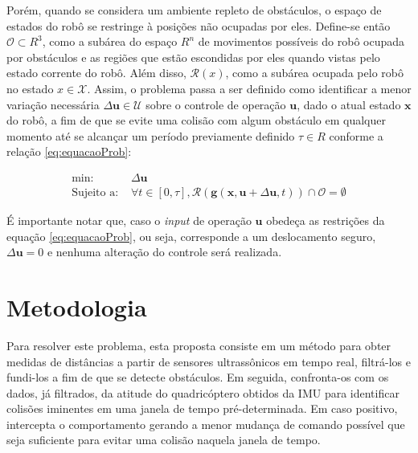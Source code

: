 \documentclass[a4paper, 12pt]{article}
\begin{document}
Porém, quando se considera um ambiente repleto de obstáculos, o espaço de estados do robô se restringe à posições não ocupadas por eles. Define-se então $\mathcal{O} \subset R^3$, como a subárea do espaço $R^n$ de movimentos possíveis do robô ocupada por obstáculos e as regiões que estão escondidas por eles quando vistas pelo estado corrente do robô. Além disso, $\mathcal{R}(x)$, como a subárea ocupada pelo robô no estado $x \in \mathcal{X}$. Assim, o problema passa a ser definido como identificar a menor variação necessária  $\Delta\mathbf{u} \in \mathcal{U}$ sobre o controle de operação $\mathbf{u}$, dado o atual estado $\mathbf{x}$ do robô, a fim de que se evite uma colisão com algum obstáculo em qualquer momento até se alcançar um período previamente definido $\tau \in R$ conforme a relação \ref{eq:equacaoProb}:

\begin{equation}
\begin{aligned}
\text{min: }& \Delta\mathbf{u} \\
\text{Sujeito a: }& \forall t \in [0,\tau], \mathcal{R}(\mathbf{g}(\mathbf{x}, \mathbf{u}+\Delta\mathbf{u}, t)) \cap \mathcal{O} = \emptyset
\end{aligned}
\label{eq:equacaoProb}
\end{equation}



É importante notar que, caso o \textit{input} de operação $\mathbf{u}$ obedeça as restrições da equação \ref{eq:equacaoProb}, ou seja, corresponde a um deslocamento seguro, $\Delta\mathbf{u} = 0$ e nenhuma alteração do controle será realizada.

\newpage

\section{Metodologia}
\label{sec:meto}

Para resolver este problema, esta proposta consiste em um método para obter medidas de distâncias a partir de sensores ultrassônicos em tempo real, filtrá-los e fundi-los a fim de que se detecte obstáculos. Em seguida, confronta-os com os dados, já filtrados, da atitude do quadricóptero obtidos da IMU para identificar colisões iminentes em uma janela de tempo pré-determinada. Em caso positivo, intercepta o comportamento gerando a menor mudança de comando possível que seja suficiente para evitar uma colisão naquela janela de tempo.
\end{document}
